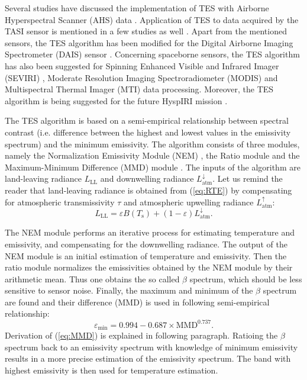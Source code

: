 Several studies have discussed the implementation of TES with Airborne Hyperspectral Scanner (AHS) data \cite{SJ06, JS12}. Application of TES to data acquired by the TASI sensor is mentioned in a few studies as well \cite{WX11, PP12}. Apart from the mentioned sensors, the TES algorithm has been modified for the Digital Airborne Imaging Spectrometer (DAIS) sensor \cite{SJ02}. Concerning spaceborne sensors, the TES algorithm has also been suggested for Spinning Enhanced Visible and Infrared Imager (SEVIRI) \cite{JS14}, Moderate Resolution Imaging Spectroradiometer (MODIS) \cite{HH11} and Multispectral Thermal Imager (MTI) \cite{MB02} data processing. Moreover, the TES algorithm is being suggested for the future HyspIRI mission \cite{hulley-hyspiri-2011}.

The TES algorithm is based on a semi-empirical relationship between spectral contrast (i.e. difference between the highest and lowest values in the emissivity spectrum) and the minimum emissivity. The algorithm consists of three modules, namely the Normalization Emissivity Module (NEM) \cite{G86}, the Ratio module and the Maximum-Minimum Difference (MMD) module \cite{M94}. The inputs of the algorithm are land-leaving radiance $L_\mathrm{LL}$ and downwelling radiance $L^{\downarrow}_\mathrm{atm}$. Let us remind the reader that land-leaving radiance is obtained from (\ref{eq:RTE}) by compensating for atmospheric transmissivity $\tau$ and atmospheric upwelling radiance $L^{\uparrow}_\mathrm{atm}$:
\begin{equation}
\label{eq:landleavingRadiance}
L_\mathrm{LL} = \varepsilon B(T_\mathrm{s}) + (1 - \varepsilon) L^\downarrow_\mathrm{atm}.
\end{equation}

The NEM module performs an iterative process for estimating temperature and emissivity, and compensating for the downwelling radiance. The output of the NEM module is an initial estimation of temperature and emissivity. Then the ratio module normalizes the emissivities obtained by the NEM module by their arithmetic mean. Thus one obtains the so called $\beta$ spectrum, which should be less sensitive to sensor noise. Finally, the maximum and minimum of the $\beta$ spectrum are found and their difference (MMD) is used in following semi-empirical relationship:
\begin{equation} 
\label{eq:MMD}
\varepsilon_\mathrm{min} = 0.994 - 0.687 \times \mathrm{MMD}^{0.737}. 
\end{equation}
Derivation of (\ref{eq:MMD}) is explained in following paragraph. Ratioing the $\beta$ spectrum back to an emissivity spectrum with knowledge of minimum emissivity results in a more precise estimation of the emissivity spectrum. The band with highest emissivity is then used for temperature estimation.

